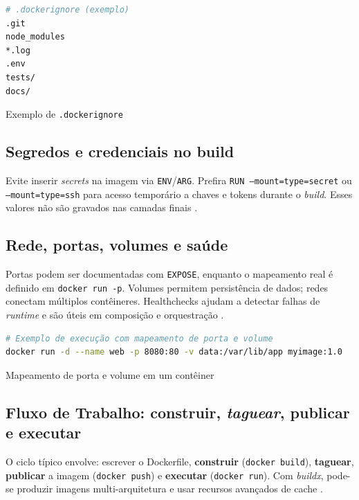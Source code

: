 \begin{codigo}[H]
\begin{lstlisting}[language=bash]
# .dockerignore (exemplo)
.git
node_modules
*.log
.env
tests/
docs/
\end{lstlisting}
\caption{Exemplo de \texttt{.dockerignore}}
\label{lst:dockerignore}
\end{codigo}

\subsection{Segredos e credenciais no build}
\label{subsec:secrets}

Evite inserir \textit{secrets} na imagem via \texttt{ENV}/\texttt{ARG}. Prefira \texttt{RUN --mount=type=secret} ou \texttt{--mount=type=ssh} para acesso temporário a chaves e tokens durante o \textit{build}. Esses valores não são gravados nas camadas finais \cite{dockerfile_ref}. 

\subsection{Rede, portas, volumes e saúde}
\label{sec:network-storage}

Portas podem ser documentadas com \texttt{EXPOSE}, enquanto o mapeamento real é definido em \texttt{docker run -p}. Volumes permitem persistência de dados; redes conectam múltiplos contêineres. Healthchecks ajudam a detectar falhas de \textit{runtime} e são úteis em composição e orquestração \cite{dockerfile_ref,docker_overview}.

\begin{codigo}[H]
\begin{lstlisting}[language=bash]
# Exemplo de execução com mapeamento de porta e volume
docker run -d --name web -p 8080:80 -v data:/var/lib/app myimage:1.0
\end{lstlisting}
\caption{Mapeamento de porta e volume em um contêiner}
\label{lst:docker-run-ports-vol}
\end{codigo}

\subsection{Fluxo de Trabalho: construir, \textit{taguear}, publicar e executar}
\label{sec:workflow}

O ciclo típico envolve: escrever o Dockerfile, \textbf{construir} (\texttt{docker build}), \textbf{taguear}, \textbf{publicar} a imagem (\texttt{docker push}) e \textbf{executar} (\texttt{docker run}). Com \textit{buildx}, pode-se produzir imagens multi-arquitetura e usar recursos avançados de cache \cite{docker_overview,dockerfile_ref}.

